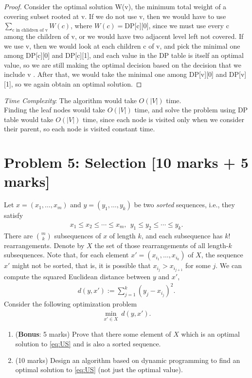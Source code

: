 \documentclass[11pt,twoside]{article}
\newcommand{\problem}[1]{\section*{Problem #1}}
\newenvironment{solution}{{\par\noindent\it Solution.}}{}
\begin{document}
\begin{solution}
\begin{proof}
Consider the optimal solution W(v), the minimum total weight of a covering subset rooted at v. If we do not use v, then we would have to use $\sum_{\text{c in chlidren of v}} W(c)$, where $W(c)= \text{DP[c][0]}$, since we must use every c among the children of v, or we would have two adjacent level left not covered. If we use v, then we would look at each children c of v, and pick the minimal one among DP[c][0] and DP[c][1], and each value in the DP table is itself an optimal value, so we are still making the optimal decision based on the decision that we include v . After that, we would take the minimal one among DP[v][0] and DP[v][1], so we again obtain an optimal solution.
\end{proof}

\textit{Time Complexity}: The algorithm would take $O(|V|)$ time.\\  Finding the leaf nodes would take $O(|V|)$ time, and solve the problem using DP table would take $O(|V|)$ time, since each node is visited only when we consider their parent, so each node is visited constant time.  

\end{solution}

\problem{5: Selection [10 marks + 5 marks]}
Let $x=(x_1,\dots,x_m)$ and $y=(y_1,\dots,y_k)$ be two \textit{sorted} sequences, i.e., they satisfy
\begin{align}
	x_1\leq x_2\leq \cdots \leq x_m, \ \ y_1\leq y_2\leq \cdots\leq y_k.
\end{align}
There are $\binom{m}{k}$ subsequences of $x$ of length $k$, and each subsequence has $k!$ rearrangements. Denote by $X$ the set of those rearrangements of all length-$k$ subsequences. Note that, for each element $x'=(x_{i_1},\dots,x_{i_k})$ of $X$, the sequence $x'$ might not be sorted, that is, it is possible that $x_{i_j}>x_{i_{j+1}}$ for some $j$. We can compute the squared Euclidean distance between $y$ and $x'$, 
\begin{align}
    d(y,x'):=\sum_{j=1}^k(y_j-x_{i_j})^2.
\end{align}
Consider the following optimization problem
\begin{align}\label{eq:US}
	\min\limits_{x'\in X}\ d(y,x').
\end{align}
\begin{enumerate}
	\item (\textbf{Bonus}: 5 marks) Prove that there some element of $X$ which is an optimal solution to \eqref{eq:US} and is also a sorted sequence.
	\item (10 marks) Design an algorithm based on dynamic programming to find an optimal solution to \eqref{eq:US} (not just the optimal value).
\end{enumerate}
\end{document}
